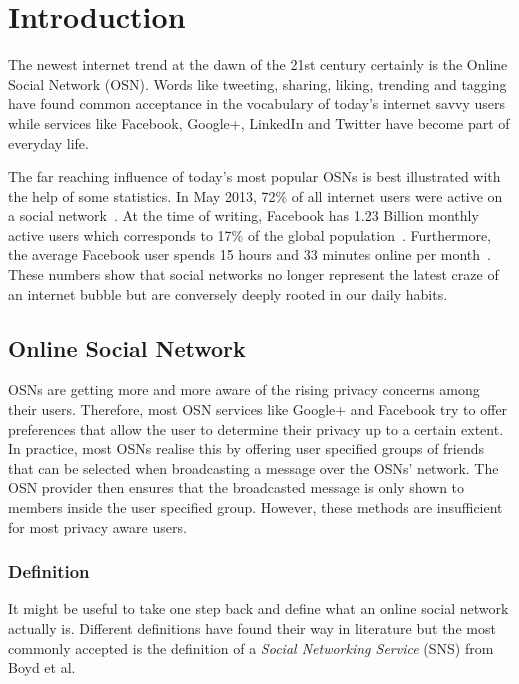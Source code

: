 \chapter{Introduction}
\label{cha:intro}
The newest internet trend at the dawn of the 21st century certainly is the Online Social Network (OSN). Words like tweeting, sharing, liking, trending and tagging have found common acceptance in the vocabulary of today's internet savvy users while services like Facebook, Google+, LinkedIn and Twitter have become part of everyday life. 

The far reaching influence of today's most popular OSNs is best illustrated with the help of some statistics. In May 2013, 72\% of all internet users were active on a social network~\cite{site:Jones13}. At the time of writing, Facebook has 1.23 Billion monthly active users which corresponds to 17\% of the global population~\cite{site:Bullas14,site:worldometers}. Furthermore, the average Facebook user spends 15 hours and 33 minutes online per month~\cite{site:StatisticBrain}. These numbers show that social networks no longer represent the latest craze of an internet bubble but are conversely deeply rooted in our daily habits.



\section{Online Social Network}
OSNs are getting more and more aware of the rising privacy concerns among their users. Therefore, most OSN services like Google+ and Facebook try to offer preferences that allow the user to determine their privacy up to a certain extent. In practice, most OSNs realise this by offering user specified groups of friends that can be selected when broadcasting a message over the OSNs' network. The OSN provider then ensures that the broadcasted message is only shown to members inside the user specified group. However, these methods are insufficient for most privacy aware users.

\subsection{Definition}
It might be useful to take one step back and define what an online social network actually is. Different definitions have found their way in literature but the most commonly accepted is the definition of a \textit{Social Networking Service} (SNS) from Boyd et al.~\cite{art:BoydE08}

